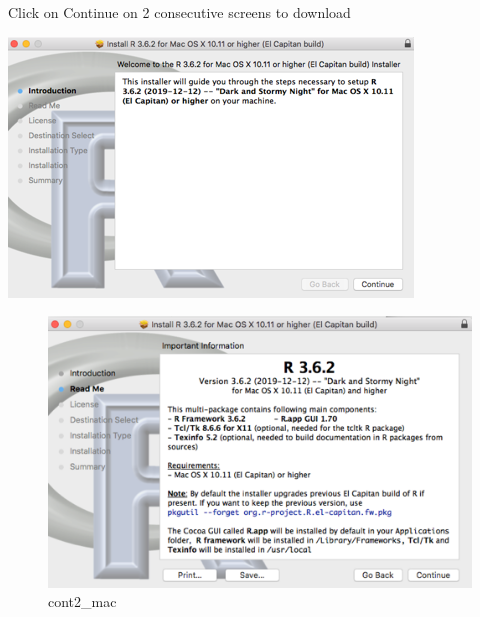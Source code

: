 \documentclass[
]{book}
\begin{document}
Click on Continue on 2 consecutive screens to download

\includegraphics{images/installrCont1mac.png}

\begin{figure}
\centering
\includegraphics{images/installrCont2mac.png}
\caption{cont2\_mac}
\end{figure}
\end{document}
